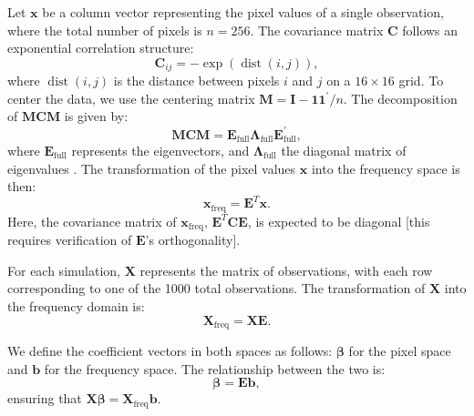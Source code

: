 \documentclass[12pt]{article}
\begin{document}
Let \( \mathbf{x} \) be a column vector representing the pixel values of a single observation, where the total number of pixels is \( n = 256 \). The covariance matrix \( \mathbf{C} \) follows an exponential correlation structure:
\[
\mathbf{C}_{ij} = -\exp(\operatorname{dist}(i,j)),
\]
where \( \operatorname{dist}(i,j) \) is the distance between pixels \( i \) and \( j \) on a \( 16 \times 16 \) grid. To center the data, we use the centering matrix \( \mathbf{M} = \mathbf{I} - \mathbf{1} \mathbf{1}^{\prime} / n \). The decomposition of \( \mathbf{MCM} \) is given by:
\[
\mathbf{MCM} = \mathbf{E}_{\text{full}} \mathbf{\Lambda}_{\text{full}} \mathbf{E}_{\text{full}}^{\prime},
\]
where \( \mathbf{E}_{\text{full}} \) represents the eigenvectors, and \( \mathbf{\Lambda}_{\text{full}} \) the diagonal matrix of eigenvalues \cite{murakami_eigenvector_2019}. The transformation of the pixel values \( \mathbf{x} \) into the frequency space is then:
\[
\mathbf{x}_{\text{freq}} = \mathbf{E}^T \mathbf{x}.
\]
Here, the covariance matrix of \( \mathbf{x}_{\text{freq}} \), \( \mathbf{E}^T \mathbf{C} \mathbf{E} \), is expected to be diagonal [this requires verification of \( \mathbf{E} \)'s orthogonality].

For each simulation, \( \mathbf{X} \) represents the matrix of observations, with each row corresponding to one of the 1000 total observations. The transformation of \( \mathbf{X} \) into the frequency domain is:
\[
\mathbf{X}_{\mathrm{freq}} = \mathbf{X} \mathbf{E}.
\]

We define the coefficient vectors in both spaces as follows: \( \boldsymbol{\beta} \) for the pixel space and \( \mathbf{b} \) for the frequency space. The relationship between the two is:
\[
\boldsymbol{\beta} = \mathbf{E} \mathbf{b},
\]
ensuring that \( \mathbf{X} \boldsymbol{\beta} = \mathbf{X}_{\mathrm{freq}} \mathbf{b} \).
\end{document}
